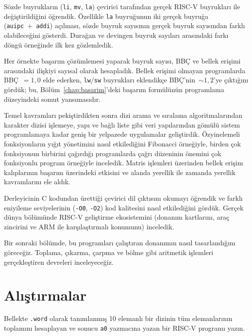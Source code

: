 Sözde buyrukların (\texttt{li}, \texttt{mv}, \texttt{la}) çevirici tarafından gerçek RISC-V buyrukları ile değiştirildiğini öğrendik. Özellikle \texttt{la} buyruğunun iki gerçek buyruğa (\texttt{auipc}~+~\texttt{addi}) açılması, sözde buyruk sayısının gerçek buyruk sayısından farklı olabileceğini gösterdi. Durağan ve devingen buyruk sayıları arasındaki farkı döngü örneğinde ilk kez gözlemledik.

Her örnekte başarım çözümlemesi yaparak buyruk sayısı, BBÇ ve bellek erişimi arasındaki ilişkiyi sayısal olarak hesapladık. Bellek erişimi olmayan programlarda BBÇ~$= 1{,}0$ elde ederken, \texttt{lw}/\texttt{sw} buyrukları eklendikçe BBÇ'nin~$\sim 1{,}2$'ye çıktığını gördük; bu, Bölüm~\ref{chap:basarim}'deki başarım formülünün programlama düzeyindeki somut yansımasıdır.

Temel kavramları pekiştirdikten sonra dizi arama ve sıralama algoritmalarından karakter dizisi işlemeye, yapı ve bağlı liste gibi veri yapılarından gömülü sistem programlamaya kadar geniş bir yelpazede uygulamalar geliştirdik. Özyinelemeli fonksiyonların yığıt yönetimini nasıl etkilediğini Fibonacci örneğiyle, birden çok fonksiyonun birbirini çağırdığı programlarda çağrı düzeninin önemini çok fonksiyonlu program örneğiyle inceledik. Matris işlemleri üzerinden bellek erişim kalıplarının başarım üzerindeki etkisini ve alanda yerellik ile zamanda yerellik kavramlarını ele aldık.

Derleyicinin C kodundan ürettiği çevirici dil çıktısını okumayı öğrendik ve farklı eniyileme seviyelerinin (\texttt{-O0}, \texttt{-O2}) kod kalitesini nasıl etkilediğini gördük. Gerçek dünya bölümünde RISC-V geliştirme ekosistemini (donanım kartlarını, araç zincirini ve ARM ile karşılaştırmalı konumunu) inceledik.

Bir sonraki bölümde, bu programları çalıştıran donanımın nasıl tasarlandığını göreceğiz. Toplama, çıkarma, çarpma ve bölme gibi aritmetik işlemleri gerçekleştiren devreleri inceleyeceğiz.


\section*{Alıştırmalar}

\begin{alistirma}[\kolay]
Bellekte \texttt{.word} olarak tanımlanmış 10 elemanlı bir dizinin tüm elemanlarının toplamını hesaplayan ve sonucu \texttt{a0} yazmacına yazan bir RISC-V programı yazın.
\end{alistirma}

